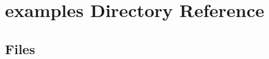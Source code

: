 \section{examples Directory Reference}
\label{dir_d28a4824dc47e487b107a5db32ef43c4}
\subsection*{Files}
\begin{DoxyCompactItemize}
\end{DoxyCompactItemize}
